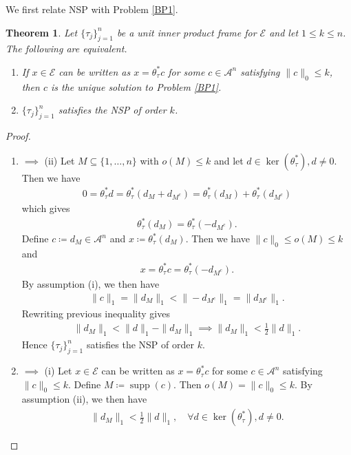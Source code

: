 \documentclass{amsart}
\newtheorem{theorem}{Theorem}[section]
\begin{document}
We first  relate NSP with Problem \ref{BP1}.
\begin{theorem}\label{IFF}
Let  $\{\tau_j\}_{j=1}^n $  be a unit inner product frame for  $\mathcal{E}$ and let $1\leq k \leq n$. The following are equivalent.
\begin{enumerate}[\upshape(i)]
	\item  If $x \in \mathcal{E}$ can be written as  $	x=\theta_\tau^* c$ for some  $c \in \mathcal{A}^n$ satisfying $\|c\|_0\leq k$, then $c$ is the unique solution to Problem \ref{BP1}.
	\item   $\{\tau_j \}_{j=1}^n$ satisfies the  NSP of order $k$.
\end{enumerate}	
\end{theorem}
\begin{proof}
\begin{enumerate}[\upshape(i)]
	\item 	$\implies$ (ii) Let $ M \subseteq     \{1, \dots, n\} $ with $o(M)\leq k$ and let $d \in \ker(\theta_\tau^*), d \neq 0$. Then we have 
	\begin{align*}
	0=\theta_\tau^* d=\theta_\tau^*(d_M+d_{M^c})=\theta_\tau^*(d_M)+\theta_\tau^*(d_{M^c})
	\end{align*}
which gives 
\begin{align*}
	\theta_\tau^*(d_M)=\theta_\tau^*(-d_{M^c}).
\end{align*}
Define $c\coloneqq d_M \in \mathcal{A}^n$ and $x\coloneqq \theta_\tau^*(d_M)$. Then we have $\|c\|_0\leq o(M)\leq k$ and 
\begin{align*}
	x=\theta_\tau^* c=\theta_\tau^*(-d_{M^c}).
\end{align*}
By assumption (i),  we then have 
\begin{align*}
	\|c\|_1=\|d_M\|_1<\|-d_{M^c}\|_1=\|d_{M^c}\|_1.
\end{align*}
Rewriting previous inequality gives 
\begin{align*}
	\|d_M\|_1<\|d\|_1-\|d_M\|_1 \implies 	\|d_M\|_1<\frac{1}{2}\|d\|_1.
\end{align*}
Hence $\{\tau_j \}_{j=1}^n$  satisfies the  NSP of order $k$.
	\item    $\implies$ (i)  Let  $x \in \mathcal{E}$ can be written as  $	x=\theta_\tau^* c$ for some  $c \in \mathcal{A}^n$ satisfying $\|c\|_0\leq k$. Define $M\coloneqq \operatorname{supp}(c)$. Then $o(M)=\|c\|_0 \leq k$. By assumption (ii), we then have 
	\begin{align}\label{PI}
	\|d_M\|_1<\frac{1}{2}\|d\|_1,  \quad  \forall d \in \ker(\theta_\tau^*), d \neq 0.

\end{align}
\end{enumerate}
\end{proof}
\end{document}
